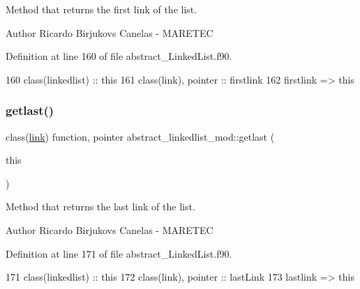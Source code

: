 Method that returns the first link of the list. 

\begin{DoxyAuthor}{Author}
Ricardo Birjukovs Canelas -\/ M\+A\+R\+E\+T\+EC 
\end{DoxyAuthor}


Definition at line 160 of file abstract\+\_\+\+Linked\+List.\+f90.


\begin{DoxyCode}
160     \textcolor{keywordtype}{class}(linkedlist) :: this
161     \textcolor{keywordtype}{class}(link), \textcolor{keywordtype}{pointer} :: firstlink
162     firstlink => this%
\end{DoxyCode}
\mbox{\label{namespaceabstract__linkedlist__mod_a7c0a2e5b554e8859fc9b4d8fb52b124f}} 
\subsubsection{\texorpdfstring{getlast()}{getlast()}}
{\footnotesize\ttfamily class(\mbox{\hyperlink{structlink__mod_1_1link}{link}}) function, pointer abstract\+\_\+linkedlist\+\_\+mod\+::getlast (\begin{DoxyParamCaption}\item[{class(\mbox{\hyperlink{structabstract__linkedlist__mod_1_1linkedlist}{linkedlist}})}]{this }\end{DoxyParamCaption})\hspace{0.3cm}{\ttfamily [private]}}



Method that returns the last link of the list. 

\begin{DoxyAuthor}{Author}
Ricardo Birjukovs Canelas -\/ M\+A\+R\+E\+T\+EC 
\end{DoxyAuthor}


Definition at line 171 of file abstract\+\_\+\+Linked\+List.\+f90.


\begin{DoxyCode}
171     \textcolor{keywordtype}{class}(linkedlist) :: this
172     \textcolor{keywordtype}{class}(link), \textcolor{keywordtype}{pointer} :: lastLink
173     lastlink => this%
\end{DoxyCode}
\mbox{\label{namespaceabstract__linkedlist__mod_ab4e548906863da517d7fedb02931b79f}} 
